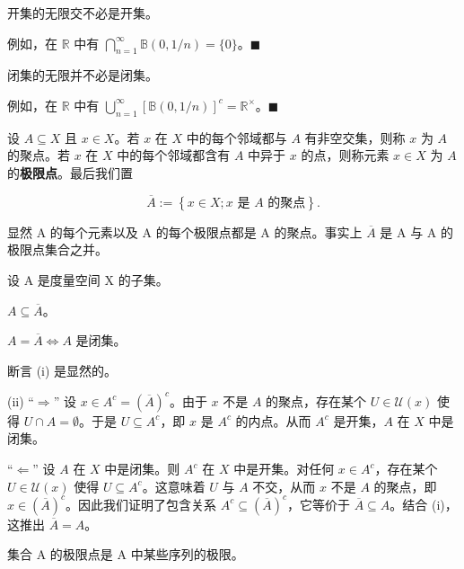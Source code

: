 \begin{remark}

\begin{items}
\item

开集的无限交不必是开集。

\proofhead
例如，在 $ \mathbb{R} $ 中有 $ \bigcap_{n=1}^{\infty} \mathbb{B}(0,1/n) = \{0\} $。$ \blacksquare $
\item

闭集的无限并不必是闭集。

\proofhead
例如，在 $ \mathbb{R} $ 中有 $ \bigcup_{n=1}^{\infty}\left[\mathbb{B}(0,1/n)\right]^{c}=\mathbb{R}^{\times} $。$ \blacksquare $
\end{items}

设 $ A \subseteq X $ 且 $ x \in X $。若 $ x $ 在 $ X $ 中的每个邻域都与 $ A $ 有非空交集，则称 $ x $ 为 $ A $ 的聚点。若 $ x $ 在 $ X $ 中的每个邻域都含有 $ A $ 中异于 $ x $ 的点，则称元素 $ x \in X $ 为 $ A $ 的\textbf{极限点}。最后我们置

\[
\overline{A}:=\left\{x\in X;x\text{ 是 }A\text{ 的聚点}\right\}.
\]

显然 A 的每个元素以及 A 的每个极限点都是 A 的聚点。事实上 $ \overline{A} $ 是 A 与 A 的极限点集合之并。

\end{remark}

\begin{proposition}

设 A 是度量空间 X 的子集。

\begin{subitems}
\item

$ A \subseteq \overline{A} $。

\item

$ A = \overline{A} \Leftrightarrow A $ 是闭集。

\proofhead
断言 (i) 是显然的。
\end{subitems}

(ii) “$\Rightarrow$” 设 $x \in A^c = (\overline{A})^c$。由于 $x$ 不是 $A$ 的聚点，存在某个 $U \in \mathcal{U}(x)$ 使得 $U \cap A = \emptyset$。于是 $U \subseteq A^c$，即 $x$ 是 $A^c$ 的内点。从而 $A^c$ 是开集，$A$ 在 $X$ 中是闭集。

“$\Leftarrow$” 设 $A$ 在 $X$ 中是闭集。则 $A^c$ 在 $X$ 中是开集。对任何 $x \in A^c$，存在某个 $U \in \mathcal{U}(x)$ 使得 $U \subseteq A^c$。这意味着 $U$ 与 $A$ 不交，从而 $x$ 不是 $A$ 的聚点，即 $x \in (\overline{A})^c$。因此我们证明了包含关系 $A^c \subseteq (\overline{A})^c$，它等价于 $\overline{A} \subseteq A$。结合 (i)，这推出 $\overline{A} = A$。

集合 A 的极限点是 A 中某些序列的极限。

\end{proposition}

